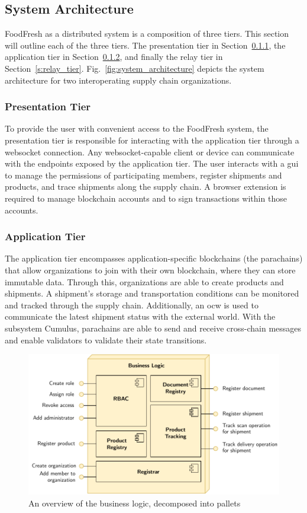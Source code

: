 \documentclass[conference]{IEEEtran}
\begin{document}
\subsection{System Architecture} \label{s:system_architecture}
FoodFresh as a distributed system is a composition of three tiers. 
This section will outline each of the three tiers. The presentation tier in Section~\ref{s:presentation_tier}, the application tier in Section~\ref{s:application_tier}, and finally the relay tier in Section~\ref{s:relay_tier}. Fig.~\ref{fig:system_architecture} depicts the system architecture for two interoperating supply chain organizations. 

\subsubsection{Presentation Tier} \label{s:presentation_tier}
To provide the user with convenient access to the FoodFresh system, the presentation tier is responsible for interacting with the application tier through a websocket connection. 
Any websocket-capable client or device can communicate with the endpoints exposed by the application tier. The user interacts with a \ac{gui} to manage the permissions of participating members, register shipments and products, and trace shipments along the supply chain. A browser extension is required to manage blockchain accounts and to sign transactions within those accounts.

\subsubsection{Application Tier} \label{s:application_tier}
The application tier encompasses application-specific blockchains (the parachains) that allow organizations to join with their own blockchain, where they can store immutable data. Through this, organizations are able to create products and shipments. A shipment's storage and transportation conditions can be monitored and tracked through the supply chain. Additionally, an \ac{ocw} is used to communicate the latest shipment status with the external world. With the subsystem Cumulus, parachains are able to send and receive cross-chain messages and enable validators to validate their state transitions.

\begin{figure}[h!]
\centerline{\includegraphics[scale=0.6]{business_logic}}
\caption{An overview of the business logic, decomposed into pallets}
\label{fig:business_logic}
\end{figure}
\end{document}
